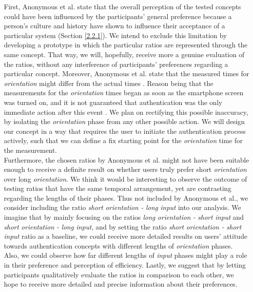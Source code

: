 First, Anonymous et al. \cite{anonymous} state that the overall perception of the tested concepts could have been influenced by the participants' general preference \cite{anonymous} because a person's culture and history have shown to influence their acceptance of a particular system \cite{Harbach:2016} (Section \ref{2.2.1}). We intend to exclude this limitation by developing a prototype in which the particular ratios are represented through the same concept. That way, we will, hopefully, receive more a genuine evaluation of the ratios, without any interference of participants' preferences regarding a particular concept. Moreover, Anonymous et al. \cite{anonymous} state that the measured times for \textit{orientation} might differ from the actual times \cite{anonymous}. Reason being that the measurements for the \textit{orientation} times began as soon as the smartphone screen was turned on, and it is not guaranteed that authentication was the only immediate action after this event \cite{anonymous}. We plan on rectifying this possible inaccuracy, by isolating the \textit{orientation} phase from any other possible action. We will design our concept in a way that requires the user to initiate the authentication process actively, such that we can define a fix starting point for the \textit{orientation} time for the measurement.\\

Furthermore, the chosen ratios by Anonymous et al. \cite{anonymous} might not have been suitable enough to receive a definite result on whether users truly prefer short \textit{orientation} over long \textit{orientation}. We think it would be interesting to observe the outcome of testing ratios that have the same temporal arrangement, yet are contrasting regarding the lengths of their phases. Thus not included by Anonymous et al., we consider including the ratio \textit{short orientation - long input} into our analysis. We imagine that by mainly focusing on the ratios \textit{long orientation - short input} and \textit{short orientation - long input}, and by setting the ratio \textit{short orientation - short input} ratio as a baseline, we could receive more detailed results on users' attitude towards authentication concepts with different lengths of \textit{orientation} phases. Also, we could observe how far different lengths of \textit{input} phases might play a role in their preference and perception of efficiency. Lastly, we suggest that by letting participants qualitatively evaluate the ratios in comparison to each other, we hope to receive more detailed and precise information about their preferences.  







